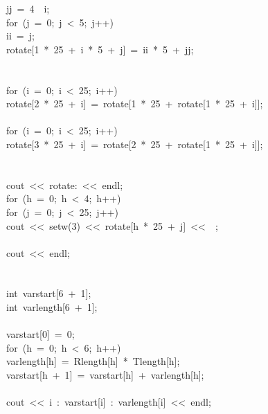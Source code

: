 \begin{tabbing}
\>\>jj\ =\ 4\ \ i;\\[0pt]
\>\>for\ (j\ =\ 0;\ j\ <\ 5;\ j++)\ \\[0pt]
\>\>\>ii\ =\ j;\\[0pt]
\>\>\>rotate[1\ *\ 25\ +\ i\ *\ 5\ +\ j]\ =\ ii\ *\ 5\ +\ jj;\\[0pt]
\>\>\>\\[0pt]
\>\>\\[0pt]
\>for\ (i\ =\ 0;\ i\ <\ 25;\ i++)\ \\[0pt]
\>\>rotate[2\ *\ 25\ +\ i]\ =\ rotate[1\ *\ 25\ +\ rotate[1\ *\ 25\ +\ i]];\\[0pt]
\>\>\\[0pt]
\>for\ (i\ =\ 0;\ i\ <\ 25;\ i++)\ \\[0pt]
\>\>rotate[3\ *\ 25\ +\ i]\ =\ rotate[2\ *\ 25\ +\ rotate[1\ *\ 25\ +\ i]];\\[0pt]
\>\>\\[0pt]
\\[0pt]
\>cout\ <<\ rotate:\ <<\ endl;\\[0pt]
\>for\ (h\ =\ 0;\ h\ <\ 4;\ h++)\ \\[0pt]
\>\>for\ (j\ =\ 0;\ j\ <\ 25;\ j++)\ \\[0pt]
\>\>\>cout\ <<\ setw(3)\ <<\ rotate[h\ *\ 25\ +\ j]\ <<\ \ ;\\[0pt]
\>\>\>\\[0pt]
\>\>cout\ <<\ endl;\\[0pt]
\>\>\\[0pt]
\\[0pt]
\>int\ varstart[6\ +\ 1];\\[0pt]
\>int\ varlength[6\ +\ 1];\\[0pt]
\>\\[0pt]
\>varstart[0]\ =\ 0;\\[0pt]
\>for\ (h\ =\ 0;\ h\ <\ 6;\ h++)\ \\[0pt]
\>\>varlength[h]\ =\ Rlength[h]\ *\ Tlength[h];\\[0pt]
\>\>varstart[h\ +\ 1]\ =\ varstart[h]\ +\ varlength[h];\\[0pt]
\>\>\\[0pt]
\>cout\ <<\ i\ :\ varstart[i]\ :\ varlength[i]\ <<\ endl;\\[0pt]

\end{tabbing}
